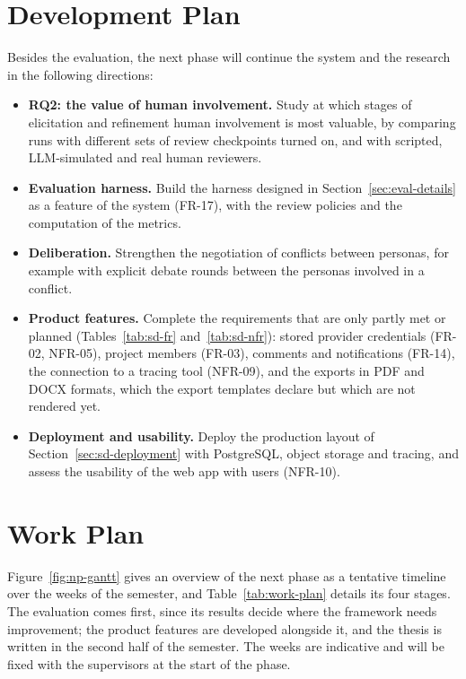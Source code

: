 \section{Development Plan}
\label{sec:dev-plan}
\label{sec:conc-future}
Besides the evaluation, the next phase will continue the system and the research in the following directions:
\begin{itemize}
    \item \textbf{RQ2: the value of human involvement.} Study at which stages of elicitation and refinement human involvement is most valuable, by comparing runs with different sets of review checkpoints turned on, and with scripted, LLM-simulated and real human reviewers.
    \item \textbf{Evaluation harness.} Build the harness designed in Section~\ref{sec:eval-details} as a feature of the system (FR-17), with the review policies and the computation of the metrics.
    \item \textbf{Deliberation.} Strengthen the negotiation of conflicts between personas, for example with explicit debate rounds between the personas involved in a conflict.
    \item \textbf{Product features.} Complete the requirements that are only partly met or planned (Tables~\ref{tab:sd-fr} and~\ref{tab:sd-nfr}): stored provider credentials (FR-02, NFR-05), project members (FR-03), comments and notifications (FR-14), the connection to a tracing tool (NFR-09), and the exports in PDF and DOCX formats, which the export templates declare but which are not rendered yet.
    \item \textbf{Deployment and usability.} Deploy the production layout of Section~\ref{sec:sd-deployment} with PostgreSQL, object storage and tracing, and assess the usability of the web app with users (NFR-10).
\end{itemize}

\section{Work Plan}
\label{sec:work-plan}
Figure~\ref{fig:np-gantt} gives an overview of the next phase as a tentative timeline over the weeks of the semester, and Table~\ref{tab:work-plan} details its four stages. The evaluation comes first, since its results decide where the framework needs improvement; the product features are developed alongside it, and the thesis is written in the second half of the semester. The weeks are indicative and will be fixed with the supervisors at the start of the phase.

